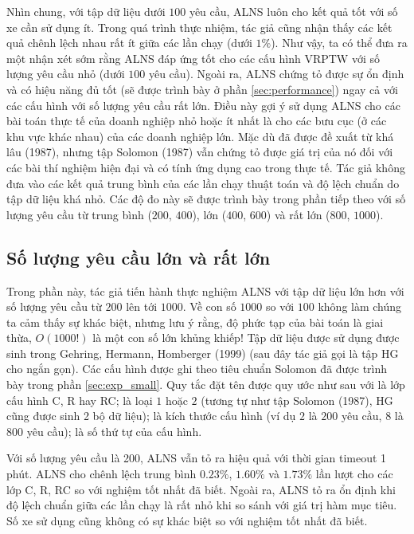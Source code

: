   Nhìn chung, với tập dữ liệu dưới $100$ yêu cầu, ALNS luôn cho kết quả tốt với số xe cần sử dụng ít. Trong quá trình thực nhiệm, tác giả cũng nhận thấy các kết quả chênh lệch nhau rất ít giữa các lần chạy (dưới $1\%$). Như vậy, ta có thể đưa ra một nhận xét sớm rằng ALNS đáp ứng tốt cho các cấu hình VRPTW với số lượng yêu cầu nhỏ (dưới $100$ yêu cầu). Ngoài ra, ALNS chứng tỏ được sự ổn định và có hiệu năng đủ tốt (sẽ được trình bày ở phần \ref{sec:performance}) ngay cả với các cấu hình với số lượng yêu cầu rất lớn. Điều này gợi ý sử dụng ALNS cho các bài toán thực tế của doanh nghiệp nhỏ hoặc ít nhất là cho các bưu cục (ở các khu vực khác nhau) của các doanh nghiệp lớn. Mặc dù đã được đề xuất từ khá lâu (1987), nhưng tập Solomon (1987) vẫn chứng tỏ được giá trị của nó đối với các bài thí nghiệm hiện đại và có tính ứng dụng cao trong thực tế. Tác giả không đưa vào các kết quả trung bình của các lần chạy thuật toán và độ lệch chuẩn do tập dữ liệu khá nhỏ. Các độ đo này sẽ được trình bày trong phần tiếp theo với số lượng yêu cầu từ trung bình ($200$, $400$), lớn ($400$, $600$) và rất lớn ($800$, $1000$).

  \subsection{Số lượng yêu cầu lớn và rất lớn}
  \label{sec:exp_large}
  
  Trong phần này, tác giả tiến hành thực nghiệm ALNS với tập dữ liệu lớn hơn với số lượng yêu cầu từ $200$ lên tới $1000$. Về con số $1000$ so với $100$ không làm chúng ta cảm thấy sự khác biệt, nhưng lưu ý rằng, độ phức tạp của bài toán là giai thừa, $O(1000!)$ là một con số lớn khủng khiếp! Tập dữ liệu được sử dụng được sinh trong Gehring, Hermann, Homberger (1999) \cite{gehring1999parallel} (sau đây tác giả gọi là tập HG cho ngắn gọn). Các cấu hình được ghi theo tiêu chuẩn Solomon đã được trình bày trong phần \ref{sec:exp_small}. Quy tắc đặt tên được quy ước như sau  với  là lớp cấu hình C, R hay RC;  là loại $1$ hoặc $2$ (tương tự như tập Solomon (1987), HG cũng được sinh 2 bộ dữ liệu);  là kích thước cấu hình (ví dụ $2$ là $200$ yêu cầu, $8$ là $800$ yêu cầu);  là số thứ tự của cấu hình.

  Với số lượng yêu cầu là 200, ALNS vẫn tỏ ra hiệu quả với thời gian timeout 1 phút. ALNS cho chênh lệch trung bình $0.23\%$, $1.60\%$ và $1.73\%$ lần lượt cho các lớp C, R, RC so với nghiệm tốt nhất đã biết. Ngoài ra, ALNS tỏ ra ổn định khi độ lệch chuẩn giữa các lần chạy là rất nhỏ khi so sánh với giá trị hàm mục tiêu. Số xe sử dụng cũng không có sự khác biệt so với nghiệm tốt nhất đã biết.

